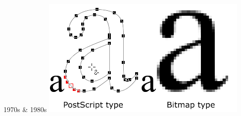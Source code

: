 \documentclass{lug}
\begin{document}
\begin{frame}{1970s \& 1980s}
{        \includegraphics[width=\textwidth]{graphics/postscript_text}
    }
\end{frame}
\end{document}
